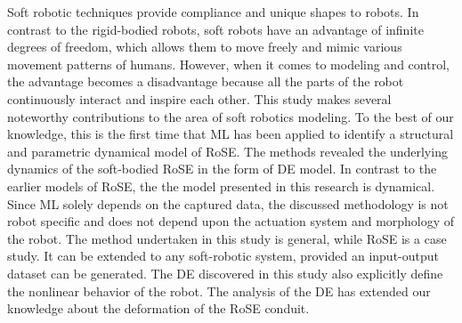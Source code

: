 Soft robotic techniques provide compliance and unique shapes
to robots. In contrast to the rigid-bodied robots, soft robots have an advantage of infinite degrees of freedom, which allows them to move freely and mimic various movement patterns of humans. However, when it comes to modeling and control, the advantage becomes a disadvantage because all the parts of the robot continuously interact and inspire each other.  This study makes several noteworthy contributions to the
area of soft robotics modeling. To the best of our knowledge, this is the first time that ML has been applied to identify a structural and
parametric dynamical model of \ac{RoSE}. The methods revealed
the underlying dynamics of the soft-bodied \ac{RoSE} in the form of
\ac{DE} model. In contrast to the earlier models of \ac{RoSE}, the
the model presented in this research is dynamical. Since ML solely depends on the captured data, the discussed methodology is not robot specific and does not depend upon the actuation system and morphology of the robot. The method undertaken in this study is general, while \ac{RoSE} is a case study. It can be extended to any soft-robotic system, provided an input-output dataset can be generated. The \ac{DE} discovered in this
study also explicitly define the nonlinear behavior of the robot.
The analysis of the \ac{DE} has extended our knowledge about the
deformation of the \ac{RoSE} conduit. 
